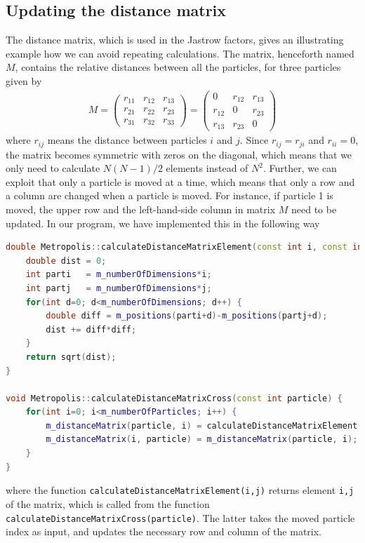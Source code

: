 \subsection{Updating the distance matrix} \label{sec:distancematrix}
The distance matrix, which is used in the Jastrow factors, gives an illustrating example how we can avoid repeating calculations. The matrix, henceforth named $M$, contains the relative distances between all the particles, for three particles given by
\begin{eqnarray}
M=
\begin{pmatrix}
r_{11} & r_{12} & r_{13} \\
r_{21} & r_{22} & r_{23} \\
r_{31} & r_{32} & r_{33}
\end{pmatrix}
=
\begin{pmatrix}
0 & r_{12} & r_{13} \\
r_{12} & 0 & r_{23} \\
r_{13} & r_{23} & 0
\end{pmatrix}
\end{eqnarray}
where $r_{ij}$ means the distance between particles $i$ and $j$. Since $r_{ij}=r_{ji}$ and $r_{ii}=0$, the matrix becomes symmetric with zeros on the diagonal, which means that we only need to calculate $N(N-1)/2$ elements instead of $N^2$. Further, we can exploit that only a particle is moved at a time, which means that only a row and a column are changed when a particle is moved. For instance, if particle 1 is moved, the upper row and the left-hand-side column in matrix $M$ need to be updated. In our program, we have implemented this in the following way
\lstset{basicstyle=\scriptsize}
\begin{lstlisting}[language=c++,caption={When a particle is moved, we update a row and a column in the distance matrix. The functions are parts of the Metropolis class, as the distance matrix is updated for every step in the Metropolis sampling. Taken from \lstinline{metropolis.cpp}.}]
double Metropolis::calculateDistanceMatrixElement(const int i, const int j) {
	double dist = 0;
	int parti   = m_numberOfDimensions*i;
	int partj   = m_numberOfDimensions*j;
	for(int d=0; d<m_numberOfDimensions; d++) {
		double diff = m_positions(parti+d)-m_positions(partj+d);
		dist += diff*diff;
	}
	return sqrt(dist);
}

void Metropolis::calculateDistanceMatrixCross(const int particle) {
	for(int i=0; i<m_numberOfParticles; i++) {
		m_distanceMatrix(particle, i) = calculateDistanceMatrixElement(particle, i);
		m_distanceMatrix(i, particle) = m_distanceMatrix(particle, i);
	}
}

\end{lstlisting}
where the function \lstinline{calculateDistanceMatrixElement(i,j)} returns element \lstinline{i,j} of the matrix, which is called from the function \lstinline{calculateDistanceMatrixCross(particle)}. The latter takes the moved particle index as input, and updates the necessary row and column of the matrix. 

